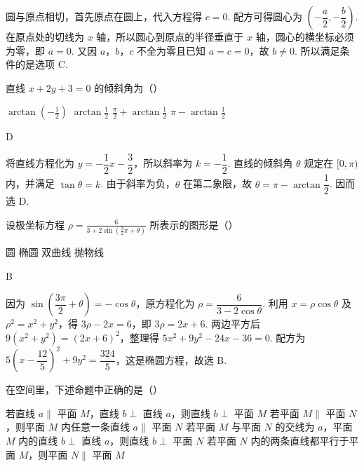 \documentclass[UTF8,a4paper,oneside,11pt]{ctexbook}
\begin{document}
\begin{solution}
圆与原点相切，首先原点在圆上，代入方程得 \(c=0\). 配方可得圆心为 \(\left(-\dfrac a2,-\dfrac b2\right)\). 在原点处的切线为 \(x\) 轴，所以圆心到原点的半径垂直于 \(x\) 轴，圆心的横坐标必须为零，即 \(a=0\). 又因 \(a\)，\(b\)，\(c\) 不全为零且已知 \(a=c=0\)，故 \(b\neq0\). 所以满足条件的是选项 C.
\end{solution}

\begin{problem}
直线 \(x+2y+3=0\) 的倾斜角为（\quad）

\choices
    {\(\arctan\left(-\frac{1}{2}\right)\)}
    {\(\arctan\frac{1}{2}\)}
    {\(\frac{\pi}{2}+\arctan\frac{1}{2}\)}
    {\(\pi-\arctan\frac{1}{2}\)}
\end{problem}

\begin{answer}
D
\end{answer}

\begin{solution}
将直线方程化为 \(y=-\dfrac12x-\dfrac32\)，所以斜率为 \(k=-\dfrac12\). 直线的倾斜角 \(\theta\) 规定在 \([0,\pi)\) 内，并满足 \(\tan\theta=k\). 由于斜率为负，\(\theta\) 在第二象限，故 \(\theta=\pi-\arctan\dfrac12\). 因而选 D.
\end{solution}

\begin{problem}
设极坐标方程 \(\rho=\frac{6}{3+2\sin\left(\frac{3}{2}\pi+\theta\right)}\) 所表示的图形是（\quad）

\choices
    {圆}
    {椭圆}
    {双曲线}
    {抛物线}
\end{problem}

\begin{answer}
B
\end{answer}

\begin{solution}
因为 \(\sin\left(\dfrac{3\pi}{2}+\theta\right)=-\cos\theta\)，原方程化为 \(\rho=\dfrac{6}{3-2\cos\theta}\). 利用 \(x=\rho\cos\theta\) 及 \(\rho^2=x^2+y^2\)，得 \(3\rho-2x=6\)，即 \(3\rho=2x+6\). 两边平方后
\(9(x^2+y^2)=(2x+6)^2\)，整理得 \(5x^2+9y^2-24x-36=0\). 配方为 \(5\left(x-\dfrac{12}{5}\right)^2+9y^2=\dfrac{324}{5}\)，这是椭圆方程，故选 B.
\end{solution}

\begin{problem}
在空间里，下述命题中正确的是（\quad）

\choices
    {若直线 \(a\parallel\) 平面 \(M\)，直线 \(b\perp\) 直线 \(a\)，则直线 \(b\perp\) 平面 \(M\)}
    {若平面 \(M\parallel\) 平面 \(N\)，则平面 \(M\) 内任意一条直线 \(a\parallel\) 平面 \(N\)}
    {若平面 \(M\) 与平面 \(N\) 的交线为 \(a\)，平面 \(M\) 内的直线 \(b\perp\) 直线 \(a\)，则直线 \(b\perp\) 平面 \(N\)}
    {若平面 \(N\) 内的两条直线都平行于平面 \(M\)，则平面 \(N\parallel\) 平面 \(M\)}
\end{problem}
\end{document}
